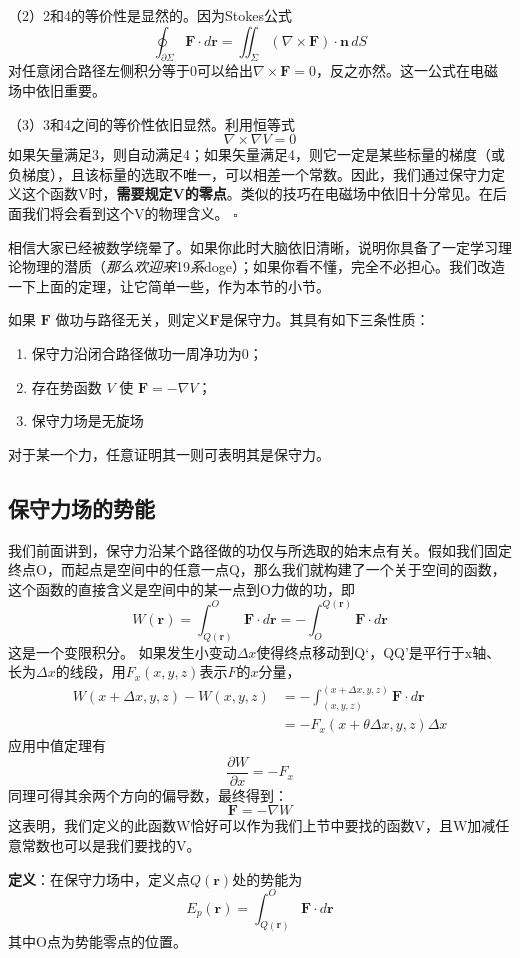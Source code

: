 \documentclass[UTF-8]{ctexart}
\begin{document}
\noindent（2）2和4的等价性是显然的。因为Stokes公式
\[
\oint_{\partial \Sigma} \mathbf{F} \cdot d\mathbf{r}
= \iint_{\Sigma} (\nabla \times \mathbf{F}) \cdot \mathbf{n} \, dS
\]
对任意闭合路径左侧积分等于0可以给出$\nabla \times \mathbf{F} = 0$，反之亦然。这一公式在电磁场中依旧重要。

\noindent（3）3和4之间的等价性依旧显然。利用恒等式
\[
\nabla \times \nabla V = 0
\]
如果矢量满足3，则自动满足4；如果矢量满足4，则它一定是某些标量的梯度（或负梯度），且该标量的选取不唯一，可以相差一个常数。因此，我们通过保守力定义这个函数V时，\textbf{需要规定V的零点}。类似的技巧在电磁场中依旧十分常见。在后面我们将会看到这个V的物理含义。
\hfill$\square$

相信大家已经被数学绕晕了。如果你此时大脑依旧清晰，说明你具备了一定学习理论物理的潜质（\textit{那么欢迎来}19\textit{系}doge）；如果你看不懂，完全不必担心。我们改造一下上面的定理，让它简单一些，作为本节的小节。
\begin{tcolorbox}[colback=white!5!white, colframe=red!75!black, title=保守力小结]
如果 \(\mathbf{F}\) 做功与路径无关，则定义$\mathbf{F}$是保守力。其具有如下三条性质：
\begin{enumerate}
\item 保守力沿闭合路径做功一周净功为0；
\item 存在势函数 \(V\) 使 \(\mathbf{F}=-\nabla V\)；
\item 保守力场是无旋场
\end{enumerate}
对于某一个力，任意证明其一则可表明其是保守力。
\end{tcolorbox}
\subsection{保守力场的势能}
我们前面讲到，保守力沿某个路径做的功仅与所选取的始末点有关。假如我们固定终点O，而起点是空间中的任意一点Q，那么我们就构建了一个关于空间的函数，这个函数的直接含义是空间中的某一点到O力做的功，即
\[
W(\textbf{r}) = \int_{Q(\textbf{r})}^{O}  \mathbf{F}\cdot d\mathbf{r} = -  \int_{O}^{Q(\textbf{r})}  \mathbf{F}\cdot d\mathbf{r}
\]
这是一个变限积分。
如果发生小变动$\Delta x$使得终点移动到Q‘，QQ'是平行于x轴、长为$\Delta x$的线段，用$F_x (x,y,z)$表示$F$的$x$分量，
\[
\begin{aligned}
W(x+\Delta x,y,z) - W(x,y,z) &= -  \int_{(x,y,z)}^{(x+\Delta x,y,z)}  \mathbf{F}\cdot d\mathbf{r} \\&= -  F_x (x+\theta \Delta x,y,z) \Delta x
\end{aligned}
\]
应用中值定理有
\[
\frac{\partial W}{\partial x} = - F_x
\]
同理可得其余两个方向的偏导数，最终得到：
\[
\mathbf{F}=-\nabla W
\]
这表明，我们定义的此函数W恰好可以作为我们上节中要找的函数V，且W加减任意常数也可以是我们要找的V。
\begin{tcolorbox}[colback=white!5!white,colframe=green!50!black,title=保守力场势能的定义]
\textbf{定义}：在保守力场中，定义点$Q(\textbf{r})$处的势能为
\[
E_p(\textbf{r}) = \int_{Q(\textbf{r})}^{O}  \mathbf{F}\cdot d\mathbf{r} 
\]
其中O点为势能零点的位置。
\end{tcolorbox}
\end{document}
